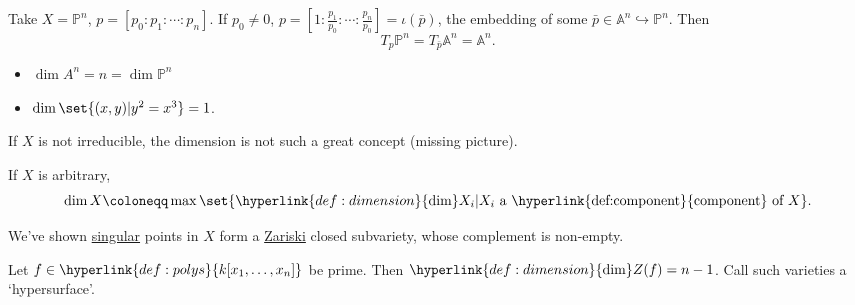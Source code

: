 \documentclass{article}
\newcommand{\A}{\mathbb{A}}
\newcommand{\proj}{\mathbb{P}}
\begin{document}
\begin{eg}
    Take $X = \proj^n$, $p = [p_0: p_1: \dotsb: p_n]$. If $p_0 \neq 0$, $p = [1: \frac{p_1}{p_0} : \dotsb : \frac{p_n}{p_0}] = \iota(\bar{p})$, the embedding of some $\bar{p} \in \A^n \hookrightarrow \proj^n$. Then
    \begin{equation*}
        T_p \proj^n = T_{\bar{p}} \A^n = \A^n.
    \end{equation*}
\end{eg}
\begin{eg}\leavevmode
    \begin{itemize}
        \item $\dim A^n = n = \dim \proj^n$
        \item $\dim \set{(x, y) | y^2 = x^3} = 1$.
    \end{itemize}
\end{eg}
If $X$ is not irreducible, the dimension is not such a great concept (missing picture).
\begin{defi}
    If $X$ is arbitrary,
    \begin{equation*}\dim X \coloneqq \max\set{\hyperlink{def:dimension}{\dim} X_i | X_i \text{ a \hyperlink{def:component}{component} of } X}.\end{equation*}
\end{defi}
We've shown \hyperlink{def:smooth}{singular} points in $X$ form a \hyperlink{def:zariski}{Zariski} closed subvariety, whose complement is non-empty. %
\begin{lemma}
    Let $f \in \hyperlink{def:polys}{k[x_1, \dotsc, x_n]}$ be prime. Then $\hyperlink{def:dimension}{\dim} Z(f) = n-1$. Call such varieties a `hypersurface'.
\end{lemma}
\end{document}
